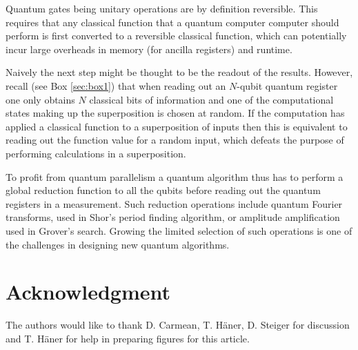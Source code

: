 \documentclass[journal]{IEEEtran}
\begin{document}
Quantum gates being unitary operations are by definition reversible. This requires that any classical function that a quantum computer computer should perform is first converted to a reversible classical function, which can potentially incur large overheads in memory (for ancilla registers) and runtime.

Naively the next step might be thought to be the readout of the results. However, recall (see Box \ref{sec:box1}) that when reading out an $N$-qubit quantum register one only obtains $N$ classical bits of information and one of the computational states making up the superposition is chosen at random. If the computation has applied a classical function to a superposition of inputs then this is  equivalent to reading out the function value for a random input, which defeats the purpose of performing calculations in a superposition. 

To profit from quantum parallelism a quantum algorithm thus has to perform a global reduction function to all the qubits before reading out the quantum registers in a measurement. Such reduction operations include quantum Fourier transforms, used in Shor's period finding algorithm, or amplitude amplification used in Grover's search. Growing the limited selection of such operations is one of the challenges in designing new quantum algorithms.







\section*{Acknowledgment}

The authors would like to thank D. Carmean, T. H\"aner, D. Steiger for discussion and T. H\"aner for help in preparing figures for this article.


\ifCLASSOPTIONcaptionsoff
  \newpage
\fi




\end{document}
